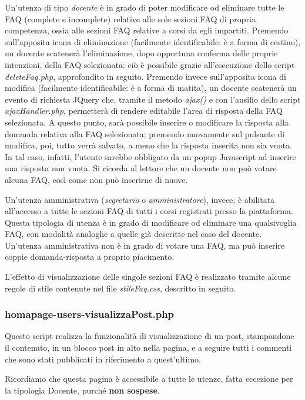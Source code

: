 \documentclass [a4paper,11pt]{book}
\begin{document}
Un'utenza di tipo \emph{docente} è in grado di poter modificare od eliminare tutte le FAQ (complete e incomplete) relative alle sole sezioni FAQ di propria competenza, ossia alle sezioni FAQ relative a corsi da egli impartiti. Premendo sull'apposita icona di eliminazione (facilmente identificabile: è a forma di cestino), un docente scatenerà l'eliminazione, dopo opportuna conferma delle proprie intenzioni, della FAQ selezionata: ciò è possibile grazie all'esecuzione dello script \emph{deleteFaq.php}, approfondito in seguito. Premendo invece sull'apposita  icona di modifica (facilmente identificabile: è a forma di matita), un docente scatenerà un evento di richiesta JQuery che, tramite il metodo 	\emph{ajax()} e con l'ausilio dello script \emph{ajaxHandler.php}, permetterà di rendere editabile l'area di risposta della FAQ selezionata. A questo punto, sarà possibile inserire o modificare la risposta alla domanda relativa alla FAQ selezionata; premendo nuovamente sul pulsante di modifica, poi, tutto verrà salvato, a meno che la risposta inserita non sia vuota. In tal caso, infatti, l'utente sarebbe obbligato da un popup Javascript ad inserire una risposta non vuota. Si ricorda al lettore che un docente non può votare alcuna FAQ, così come non può inserirne di nuove.

Un'utenza amministrativa (\emph{segretario} o \emph{amministratore}), invece, è abilitata all'accesso a tutte le sezioni FAQ di tutti i corsi registrati presso la piattaforma. Questa tipologia di utenza è in grado di modificare od eliminare una qualsivoglia FAQ, con modalità analoghe a quelle già descritte nel caso del docente. Un'utenza amministrativa non è in grado di votare una FAQ, ma può inserire coppie domanda-risposta a proprio piacimento.

L'effetto di visualizzazione delle singole sezioni FAQ è realizzato tramite alcune regole di stile contenute nel file \emph{stileFaq.css}, descritto in seguito.

\medskip

\subsubsection{homapage-users-visualizzaPost.php}

Questo script realizza la funzionalità di visualizzazione di un post, stampandone il contenuto, in un blocco post in alto nella pagina, e a seguire tutti i commenti che sono stati pubblicati in riferimento a quest'ultimo. 

Ricordiamo che questa pagina è accessibile a tutte le utenze, fatta eccezione per la tipologia Docente, purché \textbf{non sospese}.
\end{document}
